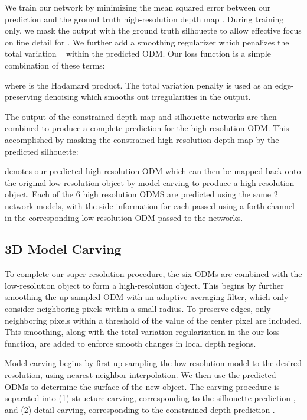 \documentclass{article}
\begin{document}
We train our network  by minimizing the mean squared error between our prediction and the ground truth high-resolution depth map . During training only, we mask the output with the ground truth silhouette to allow effective focus on fine detail for . We further add a smoothing regularizer which penalizes the total variation ~\cite{rudin1992nonlinear} within the predicted ODM. Our loss function is a simple combination of these terms:

where  is the Hadamard product. The total variation penalty is used as an edge-preserving denoising which smooths out irregularities in the output. 
 
The output of the constrained depth map and silhouette networks are then combined to produce a complete prediction for the high-resolution ODM. This accomplished by masking the constrained high-resolution depth map by the predicted silhouette: 

 denotes our predicted high resolution ODM which can then be mapped back onto the original low resolution object by model carving to produce a high resolution object. Each of the 6 high resolution ODMS are predicted using the same 2 network models, with the side information for each passed using a forth channel in the corresponding low resolution ODM passed to the networks. 

\subsection{3D Model Carving} \label{sec:model-carving}

To complete our super-resolution procedure, the six ODMs are combined with the low-resolution object to form a high-resolution object. This begins by further smoothing the up-sampled ODM with an adaptive averaging filter, which only consider neighboring pixels within a small radius. To preserve edges, only neighboring pixels within a threshold of the value of the center pixel are included. This smoothing, along with the total variation regularization in the our loss function, are added to enforce smooth changes in local depth regions. 

Model carving begins by first up-sampling the low-resolution model to the desired resolution, using nearest neighbor interpolation. We then use the predicted ODMs  to determine the surface of the new object. The carving procedure is separated into (1) structure carving, corresponding to the silhouette prediction , and (2) detail carving, corresponding to the constrained depth prediction . 
\end{document}
